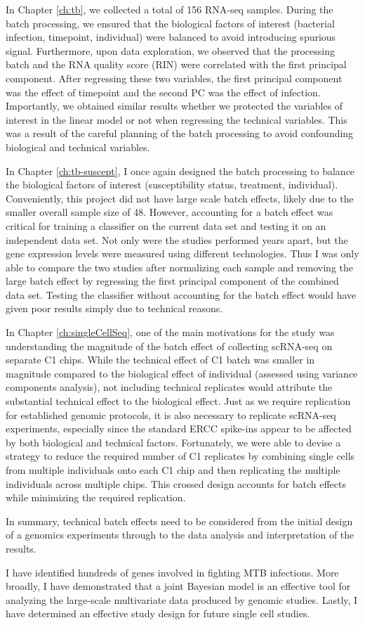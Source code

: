 In Chapter \ref{ch:tb}, we collected a total of 156 RNA-seq
samples. During the batch processing, we ensured that the biological
factors of interest (bacterial infection, timepoint, individual) were
balanced to avoid introducing spurious signal. Furthermore, upon data
exploration, we observed that the processing batch and the RNA quality
score (RIN) were correlated with the first principal component. After
regressing these two variables, the first principal component was the
effect of timepoint and the second PC was the effect of
infection. Importantly, we obtained similar results whether we
protected the variables of interest in the linear model or not when
regressing the technical variables. This was a result of the careful
planning of the batch processing to avoid confounding biological and
technical variables.

In Chapter \ref{ch:tb-suscept}, I once again designed the batch
processing to balance the biological factors of interest
(susceptibility status, treatment, individual). Conveniently, this
project did not have large scale batch effects, likely due to the
smaller overall sample size of 48. However, accounting for a batch
effect was critical for training a classifier on the current data set
and testing it on an independent data set. Not only were the studies
performed years apart, but the gene expression levels were measured
using different technologies. Thus I was only able to compare the two
studies after normalizing each sample and removing the large batch
effect by regressing the first principal component of the combined
data set. Testing the classifier without accounting for the batch
effect would have given poor results simply due to technical reasons.

In Chapter \ref{ch:singleCellSeq}, one of the main motivations for the
study was understanding the magnitude of the batch effect of
collecting scRNA-seq on separate C1 chips. While the technical effect
of C1 batch was smaller in magnitude compared to the biological effect
of individual (assessed using variance components analysis), not
including technical replicates would attribute the substantial
technical effect to the biological effect. Just as we require
replication for established genomic protocols, it is also necessary to
replicate scRNA-seq experiments, especially since the standard ERCC
spike-ins appear to be affected by both biological and technical
factors. Fortunately, we were able to devise a strategy to reduce the
required number of C1 replicates by combining single cells from
multiple individuals onto each C1 chip and then replicating the
multiple individuals across multiple chips. This crossed design
accounts for batch effects while minimizing the required replication.

In summary, technical batch effects need to be considered from the
initial design of a genomics experiments through to the data analysis
and interpretation of the results.

I have identified hundreds of genes involved in fighting MTB
infections.  More broadly, I have demonstrated that a joint Bayesian
model is an effective tool for analyzing the large-scale multivariate
data produced by genomic studies. Lastly, I have determined an
effective study design for future single cell studies.
